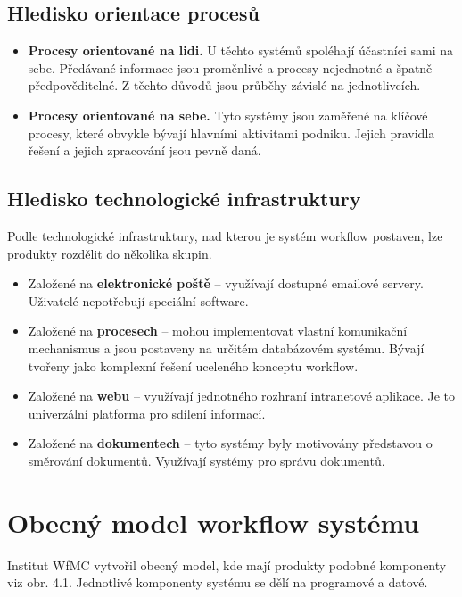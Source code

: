 \documentclass{fithesis}
\begin{document}
\subsection{Hledisko orientace procesů}
\begin{itemize}
\item \textbf{Procesy orientované na lidi.} U těchto systémů spoléhají účastníci sami na sebe. Předávané informace jsou proměnlivé a procesy nejednotné a špatně předpověditelné. Z těchto důvodů jsou průběhy závislé na jednotlivcích.
\item \textbf{Procesy orientované na sebe.} Tyto systémy jsou zaměřené na klíčové procesy, které obvykle bývají hlavními aktivitami podniku. Jejich pravidla řešení a jejich zpracování jsou pevně daná.
\end{itemize}

\subsection{Hledisko technologické infrastruktury}
Podle technologické infrastruktury, nad kterou je systém workflow postaven, lze produkty rozdělit do několika skupin.
\begin{itemize}
\item Založené na \textbf{elektronické poště} -- využívají dostupné emailové servery. Uživatelé nepotřebují speciální software.
\item Založené na \textbf{procesech} -- mohou implementovat vlastní komunikační mechanismus a jsou postaveny na určitém databázovém systému. Bývají tvořeny jako komplexní řešení uceleného konceptu workflow.
\item Založené na \textbf{webu} -- využívají jednotného rozhraní intranetové aplikace. Je to univerzální platforma pro sdílení informací.
\item Založené na \textbf{dokumentech} -- tyto systémy byly motivovány představou o směrování dokumentů. Využívají systémy pro správu dokumentů.
\end{itemize}

\section{Obecný model workflow systému}
Institut WfMC vytvořil obecný model, kde mají produkty podobné komponenty viz obr. 4.1. Jednotlivé komponenty systému se dělí na programové a datové.
\end{document}
